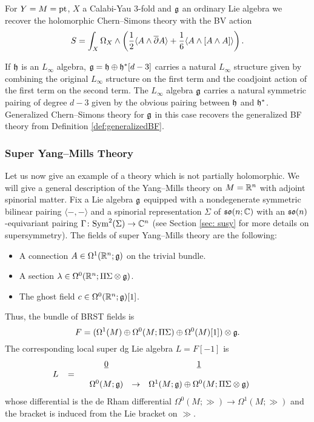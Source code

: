 \documentclass[10pt, oneside]{article}
\begin{document}
\begin{example}
For $Y=M=\operatorname{pt}$, $X$ a Calabi-Yau 3-fold and $\mathfrak g$ an ordinary Lie algebra we recover the holomorphic Chern--Simons theory with the BV action
\[S = \int_X \Omega_X\wedge \left(\frac{1}{2}\langle A\wedge \overline{\partial} A\rangle + \frac{1}{6}\langle A\wedge [A\wedge A]\rangle\right).\]
\end{example}

\begin{example}
If $\mathfrak h$ is an $L_\infty$ algebra, $\mathfrak g = \mathfrak h \oplus \mathfrak h^*[d-3]$ carries a natural $L_\infty$ structure given by combining the original $L_\infty$ structure on the first term and the coadjoint action of the first term on the second term. The $L_\infty$ algebra $\mathfrak g$ carries a natural symmetric pairing of degree $d-3$ given by the obvious pairing between $\mathfrak h$ and $\mathfrak h^*$. Generalized Chern--Simons theory for $\mathfrak g$ in this case recovers the generalized BF theory from Definition \ref{def:generalizedBF}.
\end{example}

\subsubsection{Super Yang--Mills Theory} \label{YM_section}

Let us now give an example of a theory which is not partially holomorphic. We will give a general description of the Yang--Mills theory on $M=\mathbb R^n$ with adjoint spinorial matter. Fix a Lie algebra $\mathfrak g$ equipped with a nondegenerate symmetric bilinear pairing $\langle -, -\rangle$ and a spinorial representation $\Sigma$ of $\mathfrak{so}(n; \mathbb C)$ with an $\mathfrak{so}(n)$-equivariant pairing $\Gamma \colon {\rm Sym}^2(\Sigma)\to \mathbb C^n$ (see Section \ref{sec: susy} for more details on supersymmetry). The fields of super Yang--Mills theory are the following:
\begin{itemize}
\item A connection $A \in \Omega^1(\mathbb R^n; \mathfrak g)$ on the trivial bundle.

\item A section $\lambda \in \Omega^0(\mathbb R^n; \Pi \Sigma \otimes \mathfrak g)$.

\item The ghost field $c\in\Omega^0(\mathbb R^n; \mathfrak g)[1]$.
\end{itemize}

Thus, the bundle of BRST fields is
\[F = (\Omega^1(M)\oplus \Omega^0(M; \Pi\Sigma)\oplus \Omega^0(M)[1])\otimes \mathfrak g.\]
The corresponding local super dg Lie algebra $L=F[-1]$ is
\[
L \;\;\; = \begin{array}{ccccc}
& \underline{0} & & \underline{1} & \\ 
& & & & \\
& \Omega^0(M; \mathfrak{g}) & \to & \Omega^1(M; \mathfrak{g}) \oplus \Omega^0(M; \Pi \Sigma \otimes \mathfrak{g}) & 
\end{array}
\]
whose differential is the de Rham differential $\Omega^0(M; \gg)\rightarrow \Omega^1(M; \gg)$ and the bracket is induced from the Lie bracket on $\gg$.
\end{document}

